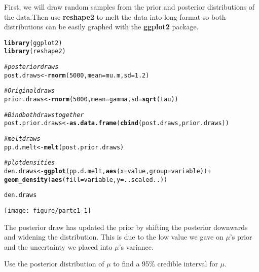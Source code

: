 \documentclass[12pt]{article}\usepackage[]{graphicx}\usepackage[]{color}
\makeatletter
\def\maxwidth{ %
  \ifdim\Gin@nat@width>\linewidth
    \linewidth
  \else
    \Gin@nat@width
  \fi
}
\newcommand{\hlnum}[1]{\textcolor[rgb]{0.686,0.059,0.569}{#1}}%
\newcommand{\hlcom}[1]{\textcolor[rgb]{0.678,0.584,0.686}{\textit{#1}}}%
\newcommand{\hlopt}[1]{\textcolor[rgb]{0,0,0}{#1}}%
\newcommand{\hlstd}[1]{\textcolor[rgb]{0.345,0.345,0.345}{#1}}%
\newcommand{\hlkwb}[1]{\textcolor[rgb]{0.69,0.353,0.396}{#1}}%
\newcommand{\hlkwc}[1]{\textcolor[rgb]{0.333,0.667,0.333}{#1}}%
\newcommand{\hlkwd}[1]{\textcolor[rgb]{0.737,0.353,0.396}{\textbf{#1}}}%
\newenvironment{kframe}{%
 \def\at@end@of@kframe{}%
 \ifinner\ifhmode%
  \def\at@end@of@kframe{\end{minipage}}%
  \begin{minipage}{\columnwidth}%
 \fi\fi%
 \def\FrameCommand##1{\hskip\@totalleftmargin \hskip-\fboxsep
 \colorbox{shadecolor}{##1}\hskip-\fboxsep
     \hskip-\linewidth \hskip-\@totalleftmargin \hskip\columnwidth}%
 \MakeFramed {\advance\hsize-\width
   \@totalleftmargin\z@ \linewidth\hsize
   \@setminipage}}%
 {\par\unskip\endMakeFramed%
 \at@end@of@kframe}
\newenvironment{knitrout}{}{} %
\newenvironment{problem}[2][Problem]{\begin{trivlist}
\item[\hskip \labelsep {\bfseries #1}\hskip \labelsep {\bfseries #2.}]}{\end{trivlist}}
\makeatother
\begin{document}
 First, we will draw random samples from the prior and posterior distributions of the data.Then use \textbf{reshape2} to melt the data into long format so both distributions can be easily graphed  with the \textbf{ggplot2} package.
\begin{knitrout}
\color{fgcolor}\begin{kframe}
\begin{alltt}
\hlkwd{library}\hlstd{(ggplot2)}
\hlkwd{library}\hlstd{(reshape2)}

\hlcom{# posterior draws}
\hlstd{post.draws} \hlkwb{<-} \hlkwd{rnorm}\hlstd{(}\hlnum{5000}\hlstd{,}\hlkwc{mean}\hlstd{=mu.m,}\hlkwc{sd}\hlstd{=}\hlnum{1.2}\hlstd{)}

\hlcom{#Original draws}
\hlstd{prior.draws} \hlkwb{<-} \hlkwd{rnorm}\hlstd{(}\hlnum{5000}\hlstd{,}\hlkwc{mean}\hlstd{=gamma,}\hlkwc{sd}\hlstd{=}\hlkwd{sqrt}\hlstd{(tau))}

\hlcom{#Bind both draws together}
\hlstd{post.prior.draws} \hlkwb{<-} \hlkwd{as.data.frame}\hlstd{(}\hlkwd{cbind}\hlstd{(post.draws,prior.draws))}

\hlcom{# melt draws}
\hlstd{pp.d.melt} \hlkwb{<-} \hlkwd{melt}\hlstd{(post.prior.draws)}
\end{alltt}


{\ttfamily\noindent\itshape\color{messagecolor}{\#\# No id variables; using all as measure variables}}\begin{alltt}
\hlcom{#plot densities}
\hlstd{den.draws} \hlkwb{<-} \hlkwd{ggplot}\hlstd{(pp.d.melt,}\hlkwd{aes}\hlstd{(}\hlkwc{x}\hlstd{=value,}\hlkwc{group}\hlstd{=variable))} \hlopt{+}
 \hlkwd{geom_density}\hlstd{(}\hlkwd{aes}\hlstd{(}\hlkwc{fill}\hlstd{=variable,}\hlkwc{y}\hlstd{=..scaled..))}

\hlstd{den.draws}
\end{alltt}
\end{kframe}

{\centering \texttt{[image: figure/partc1-1]} 

}



\end{knitrout}

The posterior draw has updated the prior by shifting the posterior downwards and widening the distribution. This is due to the low value we gave on $\mu$'s prior and the uncertainty we placed into $\mu$'s variance.

\begin{problem}{d}
Use the posterior distribution of $\mu$ to find a 95\% credible interval for $\mu$.
\end{problem}
\end{document}
